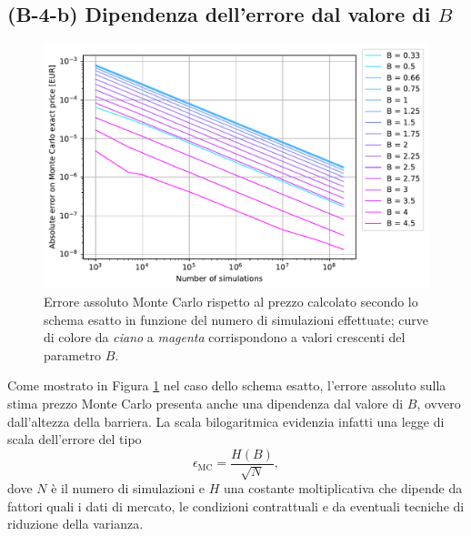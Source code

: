 \subsection{(B-4-b) Dipendenza dell'errore dal valore di $B$}

\begin{figure}[t]
    \centering
    \includegraphics[scale=0.5]{graphs/OptionPriceVsB_ExactErrorVsN_WithAllBs.pdf}
    \caption{Errore assoluto Monte Carlo rispetto al prezzo calcolato secondo lo schema esatto in funzione del numero di simulazioni effettuate; curve di colore da \textit{ciano} a \textit{magenta} corrispondono a valori crescenti del parametro $B$.}
    \label{fig:error_vs_B}
\end{figure}

Come mostrato in Figura \ref{fig:error_vs_B} nel caso dello schema esatto, l'errore assoluto sulla stima prezzo Monte Carlo presenta anche una dipendenza dal valore di $B$, ovvero dall'altezza della barriera. La scala bilogaritmica evidenzia infatti una legge di scala dell'errore del tipo
\begin{equation}
    \epsilon_\text{MC} = \frac{H(B)}{\sqrt{N}},
    \label{eq:h_of_b}
\end{equation}
dove $N$ è il numero di simulazioni e $H$ una costante moltiplicativa che dipende da fattori quali i dati di mercato, le condizioni contrattuali e da eventuali tecniche di riduzione della varianza.

